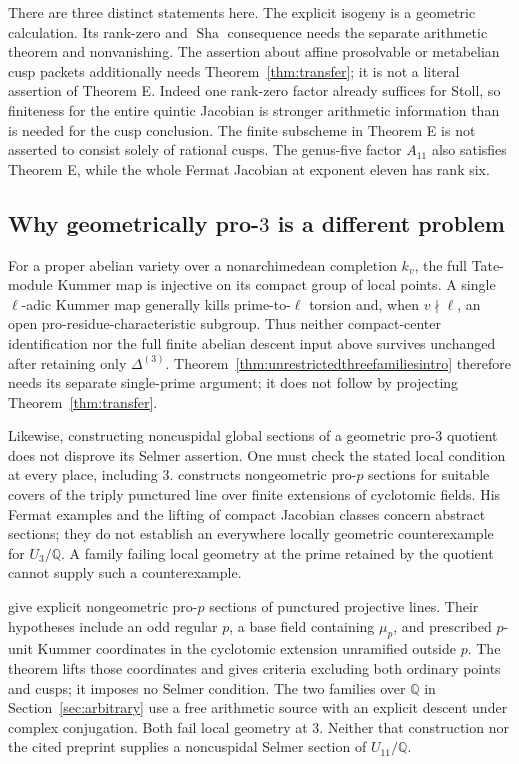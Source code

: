 \documentclass[11pt]{article}
\newcommand{\Q}{\mathbb Q}
\newcommand{\Sha}{\operatorname{Sha}}
\theoremstyle{definition}
\begin{document}
There are three distinct statements here. The explicit isogeny is a
geometric calculation. Its rank-zero and $\Sha$ consequence needs the
separate arithmetic theorem and nonvanishing. The assertion about
affine prosolvable or metabelian cusp packets additionally needs
Theorem~\ref{thm:transfer}; it is not a literal assertion of Theorem E.
Indeed one rank-zero factor already suffices for Stoll, so finiteness
for the entire quintic Jacobian is stronger arithmetic information
than is needed for the cusp conclusion. The finite subscheme in
Theorem E is not asserted to consist solely of rational cusps.
The genus-five factor $A_{11}$ also satisfies Theorem E, while the
whole Fermat Jacobian at exponent eleven has rank six.

\subsection{Why geometrically pro-\texorpdfstring{$3$}{3} is a different problem}
For a proper abelian variety over a nonarchimedean completion $k_v$,
the full Tate-module Kummer
map is injective on its compact group of local points. A single
$\ell$-adic Kummer map generally kills prime-to-$\ell$ torsion and,
when $v\nmid\ell$, an open pro-residue-characteristic subgroup.
Thus neither compact-center identification nor the full finite
abelian descent input above survives unchanged after retaining only
$\Delta^{(3)}$. Theorem~\ref{thm:unrestrictedthreefamiliesintro} therefore needs its separate
single-prime argument; it does not follow by projecting
Theorem~\ref{thm:transfer}.

Likewise, constructing noncuspidal global sections of a geometric
pro-$3$ quotient does not disprove its Selmer assertion. One must check
the stated local condition at every place, including $3$.
\citet[Theorem A; Theorem 3.5 and Corollary 3.6]{Hoshi2010} constructs
nongeometric pro-$p$ sections for suitable covers of the triply
punctured line over finite extensions of cyclotomic fields. His
Fermat examples and the lifting of compact Jacobian classes concern
abstract sections; they do not establish an everywhere locally
geometric counterexample for $U_3/\Q$. A family failing local
geometry at the prime retained by the quotient cannot supply such
a counterexample.

\citet[Theorem~A, pp.~2--3; Theorem~2.4 and Corollary~2.5,
pp.~9--11]{HoshiTsujimura2021} give explicit nongeometric pro-$p$
sections of punctured projective lines. Their hypotheses include
an odd regular $p$, a base field containing $\mu_p$, and prescribed
$p$-unit Kummer coordinates in the cyclotomic extension unramified
outside $p$. The theorem lifts those coordinates and gives criteria
excluding both ordinary points and cusps; it imposes no Selmer
condition. The two families over $\Q$ in Section~\ref{sec:arbitrary}
use a free arithmetic source with an explicit descent under complex
conjugation. Both fail local geometry at $3$. Neither that
construction nor the cited preprint supplies a noncuspidal Selmer
section of $U_{11}/\Q$.
\end{document}
